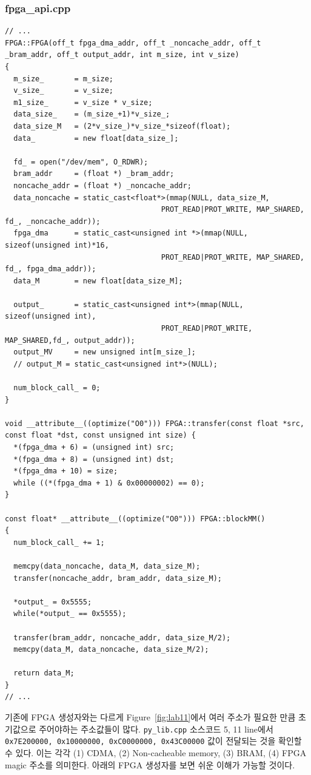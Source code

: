 \documentclass{article}
\begin{document}
\subsubsection*{fpga\_api.cpp}
\begin{lstlisting}[style={c-style}]
// ...
FPGA::FPGA(off_t fpga_dma_addr, off_t _noncache_addr, off_t _bram_addr, off_t output_addr, int m_size, int v_size)
{
  m_size_       = m_size;
  v_size_       = v_size;
  m1_size_      = v_size * v_size;
  data_size_    = (m_size_+1)*v_size_;
  data_size_M   = (2*v_size_)*v_size_*sizeof(float);
  data_         = new float[data_size_];	

  fd_ = open("/dev/mem", O_RDWR);
  bram_addr     = (float *) _bram_addr;
  noncache_addr = (float *) _noncache_addr;
  data_noncache = static_cast<float*>(mmap(NULL, data_size_M, 
                                    PROT_READ|PROT_WRITE, MAP_SHARED, fd_, _noncache_addr));
  fpga_dma      = static_cast<unsigned int *>(mmap(NULL, sizeof(unsigned int)*16, 
                                    PROT_READ|PROT_WRITE, MAP_SHARED, fd_, fpga_dma_addr));
  data_M        = new float[data_size_M];	

  output_       = static_cast<unsigned int*>(mmap(NULL, sizeof(unsigned int), 
                                    PROT_READ|PROT_WRITE, MAP_SHARED,fd_, output_addr));
  output_MV     = new unsigned int[m_size_];
  // output_M = static_cast<unsigned int*>(NULL);

  num_block_call_ = 0;
}

void __attribute__((optimize("O0"))) FPGA::transfer(const float *src, const float *dst, const unsigned int size) {
  *(fpga_dma + 6) = (unsigned int) src;
  *(fpga_dma + 8) = (unsigned int) dst;
  *(fpga_dma + 10) = size;
  while ((*(fpga_dma + 1) & 0x00000002) == 0);
}

const float* __attribute__((optimize("O0"))) FPGA::blockMM()
{
  num_block_call_ += 1;

  memcpy(data_noncache, data_M, data_size_M);
  transfer(noncache_addr, bram_addr, data_size_M);

  *output_ = 0x5555;
  while(*output_ == 0x5555);
  
  transfer(bram_addr, noncache_addr, data_size_M/2);
  memcpy(data_M, data_noncache, data_size_M/2); 

  return data_M;    
}
// ...
\end{lstlisting}

기존에 FPGA 생성자와는 다르게 Figure~\ref{fig:lab11}에서 여러 주소가 필요한 만큼 초기값으로 주어야하는 주소값들이 많다. \texttt{py\_lib.cpp} 소스코드 5, 11 line에서 \texttt{0x7E200000, 0x10000000, 0xC0000000, 0x43C00000} 값이 전달되는 것을 확인할 수 있다. 이는 각각 (1) CDMA, (2) Non-cacheable memory, (3) BRAM, (4) FPGA magic 주소를 의미한다. 아래의 FPGA 생성자를 보면 쉬운 이해가 가능할 것이다. \\
\end{document}
